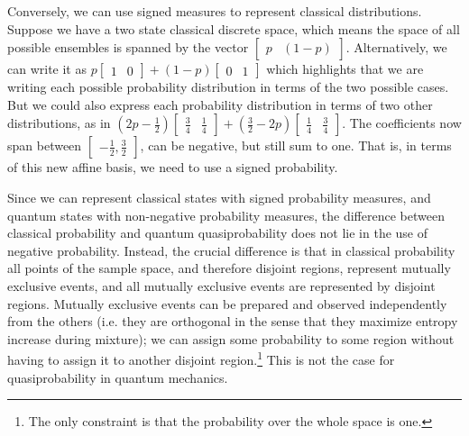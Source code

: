 \documentclass[10pt,twocolumn, nofootinbib]{revtex4-2}
\begin{document}
Conversely, we can use signed measures to represent classical distributions. Suppose we have a two state classical discrete space, which means the space of all possible ensembles is spanned by the vector $\begin{bmatrix} p & (1-p) \end{bmatrix}$. Alternatively, we can write it as $p\begin{bmatrix}1 & 0\end{bmatrix} + (1-p)\begin{bmatrix}0 & 1\end{bmatrix}$ which highlights that we are writing each possible probability distribution in terms of the two possible cases. But we could also express each probability distribution in terms of two other distributions, as in $\left(2p - \frac{1}{2}\right)\begin{bmatrix}\frac{3}{4} & \frac{1}{4}\end{bmatrix} + \left(\frac{3}{2} - 2p\right)\begin{bmatrix}\frac{1}{4} & \frac{3}{4}\end{bmatrix}$. The coefficients now span between $\begin{bmatrix}-\frac{1}{2}, \frac{3}{2}\end{bmatrix}$, can be negative, but still sum to one. That is, in terms of this new affine basis, we need to use a signed probability.

Since we can represent classical states with signed probability measures, and quantum states with non-negative probability measures, the difference between classical probability and quantum quasiprobability does not lie in the use of negative probability. Instead, the crucial difference is that in classical probability all points of the sample space, and therefore disjoint regions, represent mutually exclusive events, and all mutually exclusive events are represented by disjoint regions. Mutually exclusive events can be prepared and observed independently from the others (i.e. they are orthogonal in the sense that they maximize entropy increase during mixture); we can assign some probability to some region without having to assign it to another disjoint region.\footnote{The only constraint is that the probability over the whole space is one.} This is not the case for quasiprobability in quantum mechanics.
\end{document}
